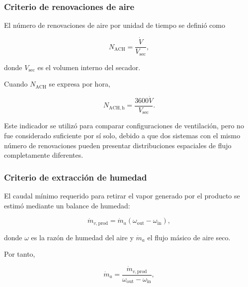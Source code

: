 \subsubsection{Criterio de renovaciones de aire}

El número de renovaciones de aire por unidad de tiempo se definió como

\begin{equation}
N_{\mathrm{ACH}}
=
\frac{\dot V}{V_{\mathrm{sec}}},
\label{eq:ach_secador}
\end{equation}

donde $V_{\mathrm{sec}}$ es el volumen interno del secador.

Cuando $N_{\mathrm{ACH}}$ se expresa por hora,

\begin{equation}
N_{\mathrm{ACH,h}}
=
\frac{3600\dot V}{V_{\mathrm{sec}}}.
\label{eq:ach_hora}
\end{equation}

Este indicador se utilizó para comparar configuraciones de ventilación, pero no fue considerado suficiente por sí solo, debido a que dos sistemas con el mismo número de renovaciones pueden presentar distribuciones espaciales de flujo completamente diferentes.

\subsubsection{Criterio de extracción de humedad}

El caudal mínimo requerido para retirar el vapor generado por el producto se estimó mediante un balance de humedad:

\begin{equation}
\dot m_{v,\mathrm{prod}}
=
\dot m_a
\left(
\omega_{\mathrm{out}}
-
\omega_{\mathrm{in}}
\right),
\label{eq:balance_humedad_actuador}
\end{equation}

donde $\omega$ es la razón de humedad del aire y $\dot m_a$ el flujo másico de aire seco.

Por tanto,

\begin{equation}
\dot m_a
=
\frac{
\dot m_{v,\mathrm{prod}}
}{
\omega_{\mathrm{out}}
-
\omega_{\mathrm{in}}
},
\label{eq:flujo_masico_humedad}
\end{equation}

